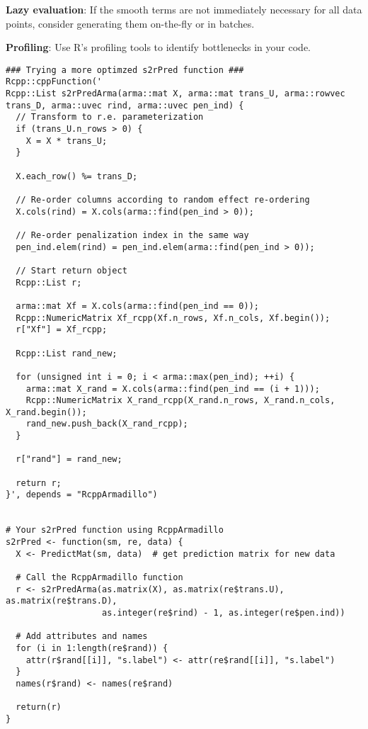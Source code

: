 \textbf{Lazy evaluation}: If the smooth terms are not immediately necessary for all data points, consider generating them on-the-fly or in batches.
\newline

\textbf{Profiling}: Use R's profiling tools to identify bottlenecks in your code.


\begin{verbatim}
### Trying a more optimzed s2rPred function ###
Rcpp::cppFunction('
Rcpp::List s2rPredArma(arma::mat X, arma::mat trans_U, arma::rowvec trans_D, arma::uvec rind, arma::uvec pen_ind) {
  // Transform to r.e. parameterization
  if (trans_U.n_rows > 0) {
    X = X * trans_U;
  }
  
  X.each_row() %= trans_D;
  
  // Re-order columns according to random effect re-ordering
  X.cols(rind) = X.cols(arma::find(pen_ind > 0));
  
  // Re-order penalization index in the same way
  pen_ind.elem(rind) = pen_ind.elem(arma::find(pen_ind > 0));
  
  // Start return object
  Rcpp::List r;
  
  arma::mat Xf = X.cols(arma::find(pen_ind == 0));
  Rcpp::NumericMatrix Xf_rcpp(Xf.n_rows, Xf.n_cols, Xf.begin());
  r["Xf"] = Xf_rcpp;
  
  Rcpp::List rand_new;
  
  for (unsigned int i = 0; i < arma::max(pen_ind); ++i) {
    arma::mat X_rand = X.cols(arma::find(pen_ind == (i + 1)));
    Rcpp::NumericMatrix X_rand_rcpp(X_rand.n_rows, X_rand.n_cols, X_rand.begin());
    rand_new.push_back(X_rand_rcpp);
  }
  
  r["rand"] = rand_new;
  
  return r;
}', depends = "RcppArmadillo")


# Your s2rPred function using RcppArmadillo
s2rPred <- function(sm, re, data) {
  X <- PredictMat(sm, data)  # get prediction matrix for new data
  
  # Call the RcppArmadillo function
  r <- s2rPredArma(as.matrix(X), as.matrix(re$trans.U), as.matrix(re$trans.D), 
                   as.integer(re$rind) - 1, as.integer(re$pen.ind))
  
  # Add attributes and names
  for (i in 1:length(re$rand)) {
    attr(r$rand[[i]], "s.label") <- attr(re$rand[[i]], "s.label")
  }
  names(r$rand) <- names(re$rand)
  
  return(r)
}

\end{verbatim}

